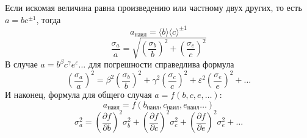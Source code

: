 Если искомая величина равна произведению или частному двух других, то есть $a = b c^{\pm 1}$, тогда
\begin{equation}
	a_\text{наил} = \langle b \rangle \langle c \rangle^{\pm 1}
\end{equation}
\begin{equation}
	\frac{\sigma_a}{a} = \sqrt{\left(\frac{\sigma_b}{b}\right)^2 + \left(\frac{\sigma_c}{c}\right)^2}
\end{equation}
В случае $a = b^\beta c^\gamma e^\varepsilon\!\!\ldots$ для погрешности справедлива формула
\begin{equation}
	\left(\frac{\sigma_a}{a}\right)^2 = \beta^2 \left(\frac{\sigma_b}{b}\right)^2 + \gamma^2 \left(\frac{\sigma_c}{c}\right)^2 + \varepsilon^2 \left(\frac{\sigma_e}{e}\right)^2 + \ldots
\end{equation}
И наконец, формула для общего случая $a = f(b, c, e, \ldots)$:
\begin{equation}
	a_\text{наил} = f(b_\text{наил}, c_\text{наил}, e_\text{наил} \ldots)
\end{equation}
\begin{equation}
	\sigma_a^2 = \left(\frac{\partial f}{\partial b}\right)^2 \sigma_b^2 + \left(\frac{\partial f}{\partial c}\right)^2 \sigma_c^2 +\left(\frac{\partial f}{\partial e}\right)^2 \sigma_e^2 + \ldots
\end{equation}
